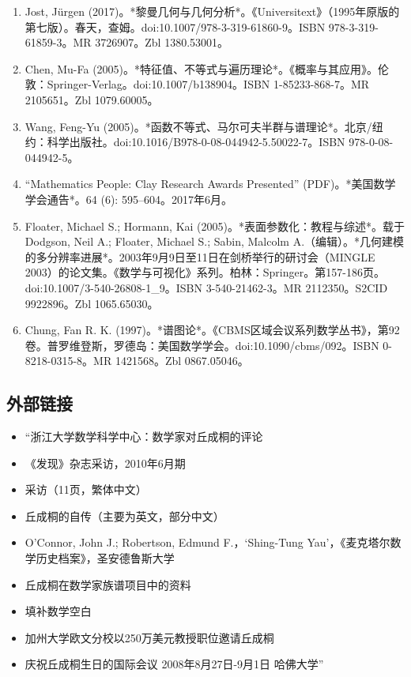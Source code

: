 \begin{enumerate}
\item Jost, Jürgen (2017)。*黎曼几何与几何分析*。《Universitext》（1995年原版的第七版）。春天，查姆。doi:10.1007/978-3-319-61860-9。ISBN 978-3-319-61859-3。MR 3726907。Zbl 1380.53001。  
\item Chen, Mu-Fa (2005)。*特征值、不等式与遍历理论*。《概率与其应用》。伦敦：Springer-Verlag。doi:10.1007/b138904。ISBN 1-85233-868-7。MR 2105651。Zbl 1079.60005。
\item Wang, Feng-Yu (2005)。*函数不等式、马尔可夫半群与谱理论*。北京/纽约：科学出版社。doi:10.1016/B978-0-08-044942-5.50022-7。ISBN 978-0-08-044942-5。  
\item “Mathematics People: Clay Research Awards Presented” (PDF)。*美国数学学会通告*。64 (6): 595–604。2017年6月。  
\item Floater, Michael S.; Hormann, Kai (2005)。*表面参数化：教程与综述*。载于 Dodgson, Neil A.; Floater, Michael S.; Sabin, Malcolm A.（编辑）。*几何建模的多分辨率进展*。2003年9月9日至11日在剑桥举行的研讨会（MINGLE 2003）的论文集。《数学与可视化》系列。柏林：Springer。第157-186页。doi:10.1007/3-540-26808-1_9。ISBN 3-540-21462-3。MR 2112350。S2CID 9922896。Zbl 1065.65030。  
\item Chung, Fan R. K. (1997)。*谱图论*。《CBMS区域会议系列数学丛书》，第92卷。普罗维登斯，罗德岛：美国数学学会。doi:10.1090/cbms/092。ISBN 0-8218-0315-8。MR 1421568。Zbl 0867.05046。
\end{enumerate}
\subsection{外部链接}
\begin{itemize}
\item “浙江大学数学科学中心：数学家对丘成桐的评论  
\item 《发现》杂志采访，2010年6月期  
\item 采访（11页，繁体中文）  
\item 丘成桐的自传（主要为英文，部分中文）  
\item O'Connor, John J.; Robertson, Edmund F.，‘Shing-Tung Yau’，《麦克塔尔数学历史档案》，圣安德鲁斯大学  
\item 丘成桐在数学家族谱项目中的资料  
\item 填补数学空白  
\item 加州大学欧文分校以250万美元教授职位邀请丘成桐  
\item 庆祝丘成桐生日的国际会议 2008年8月27日-9月1日 哈佛大学”
\end{itemize}